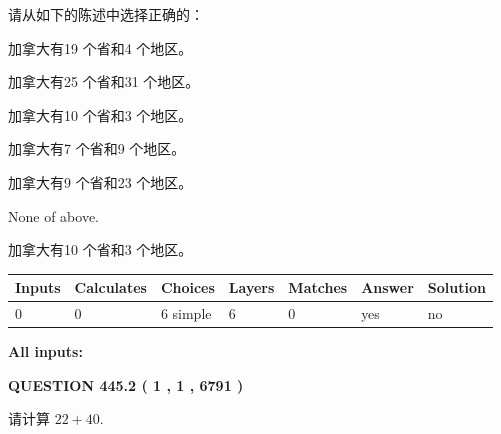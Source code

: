 \documentclass{ctexart}
\begin{document}
  
请从如下的陈述中选择正确的：
 
 
加拿大有19 个省和4 个地区。
 
 
加拿大有25 个省和31 个地区。
 
 
加拿大有10 个省和3 个地区。
 
 
加拿大有7 个省和9 个地区。
 
 
加拿大有9 个省和23 个地区。
 
 
 None of above.
 
 
\noindent{}
 
 
加拿大有10 个省和3 个地区。
 
 
\noindent{}
 
 
   
   
   
   
\noindent\begin{tabular}{|l|l|l|l|l|l|l|}
 \hline
Inputs & Calculates & Choices & Layers & Matches & Answer & Solution \\ \hline
 0  & 
 0  & 
 6
  simple  
  & 
 6  & 
 0  & 
  yes & 
  no 
  \\ \hline
 \end{tabular}
   
   
   
   
\noindent{}
   
   
   
   
\noindent\vspace{0.1in}\hspace{-0.08in} {\textbf{\Large{All inputs: }}}
   
   
  
\vspace{0.2in}
  
{\textbf{\Large{QUESTION
445.2 
 ( 1 , 1 , 6791 )
}}}
  
  
 
请计算 $ %
22 +  %
40 $.
 
 
 
\noindent{}
 
\end{document}
